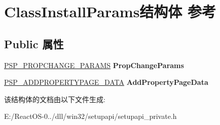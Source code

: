 \hypertarget{struct_class_install_params}{}\section{Class\+Install\+Params结构体 参考}
\label{struct_class_install_params}
\subsection*{Public 属性}
\begin{DoxyCompactItemize}
\item 
\mbox{\label{struct_class_install_params_a28381122f69900fcb4a13b6c25cea53a}} 
\hyperlink{struct___s_p___p_r_o_p_c_h_a_n_g_e___p_a_r_a_m_s}{P\+S\+P\+\_\+\+P\+R\+O\+P\+C\+H\+A\+N\+G\+E\+\_\+\+P\+A\+R\+A\+MS} {\bfseries Prop\+Change\+Params}
\item 
\mbox{\label{struct_class_install_params_a53727aac23567a232002501b757cdad3}} 
\hyperlink{struct___s_p___n_e_w_d_e_v_i_c_e_w_i_z_a_r_d___d_a_t_a}{P\+S\+P\+\_\+\+A\+D\+D\+P\+R\+O\+P\+E\+R\+T\+Y\+P\+A\+G\+E\+\_\+\+D\+A\+TA} {\bfseries Add\+Property\+Page\+Data}
\end{DoxyCompactItemize}


该结构体的文档由以下文件生成\+:\begin{DoxyCompactItemize}
\item 
E\+:/\+React\+O\+S-\/0../dll/win32/setupapi/setupapi\+\_\+private.\+h\end{DoxyCompactItemize}
